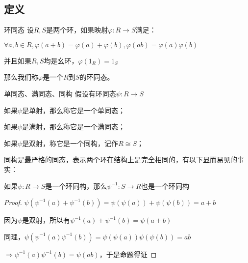 \documentclass[12pt, a4paper, oneside, UTF8]{ctexbook}
\begin{document}
		\subsection{定义}
			\begin{defn}{环同态}{}
				设$R,S$是两个环，如果映射$\varphi : R \rightarrow S$满足：

				$\forall a,b \in R,\varphi (a+b)=\varphi (a)+\varphi (b),\varphi (ab)=\varphi (a)\varphi (b)$

				并且如果$R,S$均是幺环，$\varphi (1_R)=1_S$
				
				那么我们称$\varphi $是一个$R$到$S$的环同态。
			\end{defn}
			\begin{defn}{单同态、满同态、同构}{}
				假设有环同态$\psi :R \rightarrow S$

				如果$\psi $是单射，那么称它是一个单同态；

				如果$\psi $是满射，那么称它是一个满同态；

				如果$\psi $是双射，称它是一个同构，记作$R \cong S$；
			\end{defn}
			同构是最严格的同态，表示两个环在结构上是完全相同的，有以下显而易见的事实：
			\begin{proposition}
				如果$\psi : R \rightarrow S$是一个环同构，那么$\psi^{-1} : S \rightarrow R$也是一个环同构
			\end{proposition}
			\begin{proof}
				$\psi \left(\psi^{-1} (a)+\psi^{-1} (b)\right)=\psi \left(\psi (a)\right)+\psi \left(\psi (b)\right)=a+b$

				因为$\psi $是双射，所以有$\psi^{-1} (a)+\psi^{-1} (b)=\psi (a+b)$

				同理，$\psi \left(\psi^{-1} (a)\psi^{-1} (b)\right)=\psi \left(\psi (a)\right)\psi \left(\psi (b)\right)=ab$

				$\Rightarrow \psi^{-1} (a)\psi^{-1} (b)=\psi (ab)$，于是命题得证
			\end{proof}
\end{document}
